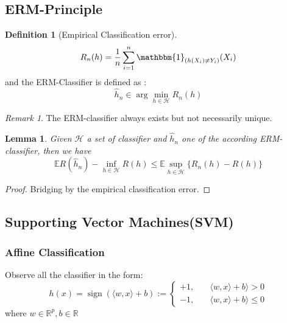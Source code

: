 \documentclass[a4paper,12pt, oneside, fleqn]{book}
\newtheorem{lemma}[theorem]{Lemma}
\theoremstyle{definition}
\newtheorem{definition}{Definition}[section]
\theoremstyle{remark}
\newtheorem*{remark}{Remark}
\DeclareMathOperator*{\sign}{sign}
\begin{document}
\subsection{ERM-Principle}
\begin{definition}[Empirical Classification error]
	\begin{equation*}
		R_n(h) = \frac{1}{n} \sum_{i = 1}^n \mathbbm{1}_{(h(X_i) \neq Y_i)}(X_i)
	\end{equation*}
	and the ERM-Classifier is defined as :
	\begin{equation*}
		\hat{h}_n \in \arg \min_{ h \in \mathcal{H}} R_n(h)
	\end{equation*}
\end{definition}

\begin{remark}
	The ERM-classifier always exists but not necessarily unique.
\end{remark}

\begin{lemma}
Given $\mathcal{H}$ a set of classifier and $\hat{h}_n$ one of the according ERM-classifier, then we have
\begin{equation*}
	\mathbb{E} R(\hat{h}_n) - \inf_{h \in \mathcal{H}} R(h) \leq \mathbb{E} \sup_{h \in \mathcal{H}} \{R_n(h) - R(h) \}
\end{equation*}
\end{lemma}

\label{technique. empirical bridging}
\begin{proof} 
	Bridging by the empirical classification error.
\end{proof}


\subsection{Supporting Vector Machines(SVM)}

\subsubsection*{Affine Classification}
Observe all the classifier in the form:
\begin{equation*}
	h(x) = \sign( \langle w, x \rangle + b) := 
	\left\{\begin{aligned}
		+1,& \quad \langle w, x \rangle + b \rangle > 0\\
		-1,& \quad \langle w, x \rangle + b \rangle \leq 0
	\end{aligned}\right.
\end{equation*}
where $w \in \mathbb{R}^p, b \in \mathbb{R}$
\end{document}
